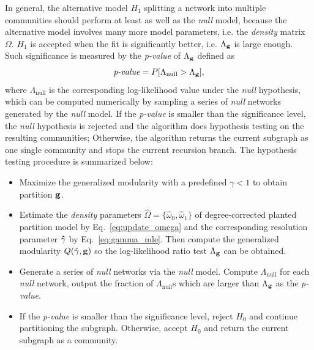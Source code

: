In general, the alternative model $H_1$ splitting a network into multiple communities should perform at least as well as the \textit{null} model, because the alternative model involves many more model parameters, i.e. the {\it density} matrix $\Omega$. $H_1$ is accepted when the fit is significantly better, i.e. $\Lambda_{\bf g}$ is large enough. Such significance is measured by the \textit{p-value} of $\Lambda_{\bf g}$ defined as
\begin{equation}
    \textit{p-value} = P [\Lambda_{\text{null}} > \Lambda_{\bf g}],
\end{equation}
where $\Lambda_{\text{null}}$ is the corresponding log-likelihood value under the {\it null} hypothesis, which can be computed numerically by sampling a series of \textit{null} networks generated by the {\it null} model. If the {\it p-value} is smaller than the significance level, the {\it null} hypothesis is rejected and the algorithm does hypothesis testing on the resulting communities; Otherwise, the algorithm returns the current subgraph as one single community and stops the current recursion branch. The hypothesis testing procedure is summarized below:
\begin{itemize}
    \item Maximize the generalized modularity with a predefined $\gamma < 1$ to obtain partition $\bf g$.
    \item Estimate the {\it density} parameters $\hat{\Omega} = \{\hat{\omega}_0, \hat{\omega}_1\}$ of degree-corrected planted partition model by Eq.~\ref{eq:update_omega} and the corresponding resolution parameter $\bf \hat{\gamma}$ by Eq.~\ref{eq:gamma_mle}. Then compute the generalized modularity $Q(\hat{\gamma}, {\bf g})$ so the log-likelihood ratio test $\Lambda_{\bf g}$ can be obtained.
    \item Generate a series of \textit{null} networks via the {\it null} model. Compute $\Lambda_{\text{null}}$ for each \textit{null} network, output the fraction of $\Lambda_{\text{null}}$s which are larger than $\Lambda_{\bf g}$ as the \textit{p-value}.
    \item If the {\it p-value} is smaller than the significance level, reject $H_0$ and continue partitioning the subgraph. Otherwise, accept $H_0$ and return the current subgraph as a community.
\end{itemize}

